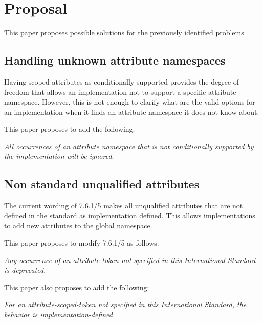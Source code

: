 \section{Proposal}

This paper proposes possible solutions for the previously identified problems

\subsection{Handling unknown attribute namespaces}

Having scoped attributes as conditionally supported provides the degree of
freedom that allows an implementation not to support a specific attribute namespace.
However, this is not enough to clarify what are the valid options for an
implementation when it finds an attribute namespace it does not know about.

This paper proposes to add the following:

\vspace{1em}
\emph{All occurrences of an attribute namespace that is not conditionally supported
by the implementation will be ignored}.

\subsection{Non standard unqualified attributes}

The current wording of 7.6.1/5 makes all unqualified attributes that are not defined
in the standard as implementation defined. This allows implementations to add new
attributes to the global namespace.

This paper proposes to modify 7.6.1/5 as follows:

\vspace{1em}
\emph{Any occurrence of an attribute-token not specified in this International
Standard is deprecated}.
\vspace{1em}

This paper also proposes to add the following:

\vspace{1em}
\emph{For an attribute-scoped-token not specified in this International
Standard, the behavior is implementation-defined.}

